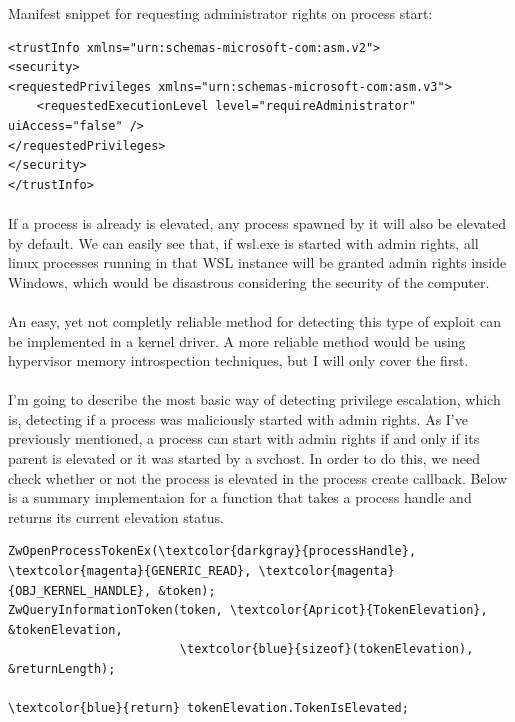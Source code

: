         Manifest snippet for requesting administrator rights on process start:
        \begin{verbatim}
<trustInfo xmlns="urn:schemas-microsoft-com:asm.v2">
<security>
<requestedPrivileges xmlns="urn:schemas-microsoft-com:asm.v3">
    <requestedExecutionLevel level="requireAdministrator" uiAccess="false" />
</requestedPrivileges>
</security>
</trustInfo>
        \end{verbatim}

        \paragraph{}
        If a process is already is elevated, any process spawned by it will also be elevated by default. We can easily see that, if wsl.exe is started with admin rights, all linux
        processes running in that WSL instance will be granted admin rights inside Windows, which would be disastrous considering the security
        of the computer.

        \paragraph{}
        An easy, yet not completly reliable method for detecting this type of exploit can be implemented in a kernel driver. A more reliable
        method would be using hypervisor memory introspection techniques, but I will only cover the first.

        \paragraph{}
        I'm going to describe the most basic way of detecting privilege escalation, which is, detecting if a process was maliciously started
        with admin rights. As I've previously mentioned, a process can start with admin rights if and only if its parent is elevated or it was started
        by a svchost. In order to do this, we need check whether or not the process is elevated in the process create callback. Below is a summary
        implementaion for a function that takes a process handle and returns its current elevation status.

        \begin{Verbatim}[fontsize=\small, commandchars=\\\{\}]
ZwOpenProcessTokenEx(\textcolor{darkgray}{processHandle}, \textcolor{magenta}{GENERIC_READ}, \textcolor{magenta}{OBJ_KERNEL_HANDLE}, &token);
ZwQueryInformationToken(token, \textcolor{Apricot}{TokenElevation}, &tokenElevation,
                        \textcolor{blue}{sizeof}(tokenElevation), &returnLength);
                        
\textcolor{blue}{return} tokenElevation.TokenIsElevated;
        \end{Verbatim}


